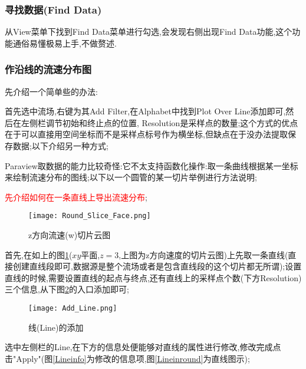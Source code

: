 \subsubsection{寻找数据(Find Data)}
从View菜单下找到Find Data菜单进行勾选,会发现右侧出现Find Data功能,这个功能通俗易懂极易上手,不做赘述.

\subsubsection{作沿线的流速分布图}
先介绍一个简单些的办法:\par

首先选中流场,右键为其Add Filter,在Alphabet中找到Plot Over Line添加即可,然后在左侧栏调节初始和终止点的位置, Resolution是采样点的数量;这个方式的优点在于可以直接用空间坐标而不是采样点标号作为横坐标,但缺点在于没办法提取保存数据;以下介绍另一种方式;\par

Paraview取数据的能力比较奇怪:它不太支持函数化操作:取一条曲线根据某一坐标来绘制流速分布的图线;以下以一个圆管的某一切片举例进行方法说明;\par
\textcolor{red}{先介绍如何在一条直线上导出流速分布};

\begin{figure}[h]
	\noindent
	\centering
	\texttt{[image: Round\_Slice\_Face.png]}
	\caption{z方向流速(w)切片云图}
	\label{roundsliceface}
\end{figure}


首先,在如上的图\ref{roundsliceface}($xy$平面,$z=3$,上图为z方向速度的切片云图)上先取一条直线(直接创建直线段即可,数据源是整个流场或者是包含直线段的这个切片都无所谓);设置直线的时候,需要设置直线的起点与终点,还有直线上的采样点个数(下方Resolution)三个信息,从下图\ref{addline}的入口添加即可;
\begin{figure}[h]
	\noindent
	\centering
	\texttt{[image: Add\_Line.png]}
	\caption{线(Line)的添加}
	\label{addline}
\end{figure}
选中左侧栏的Line,在下方的信息处便能够对直线的属性进行修改,修改完成点击"Apply"(图\ref{Lineinfo}为修改的信息项,图\ref{Lineinround}为直线图示);\par


\begin{figure}[H]
	\centering  %
	\label{lineresample}
\end{figure}

